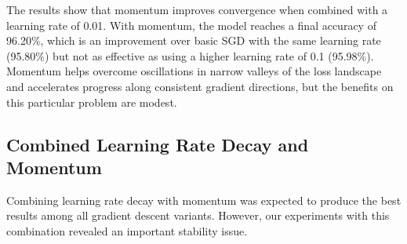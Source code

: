 \documentclass{article}
\begin{document}
The results show that momentum improves convergence when combined with a learning rate of 0.01. With momentum, the model reaches a final accuracy of 96.20\%, which is an improvement over basic SGD with the same learning rate (95.80\%) but not as effective as using a higher learning rate of 0.1 (95.98\%). Momentum helps overcome oscillations in narrow valleys of the loss landscape and accelerates progress along consistent gradient directions, but the benefits on this particular problem are modest.

\subsection{Combined Learning Rate Decay and Momentum}

Combining learning rate decay with momentum was expected to produce the best results among all gradient descent variants. However, our experiments with this combination revealed an important stability issue.
\end{document}
